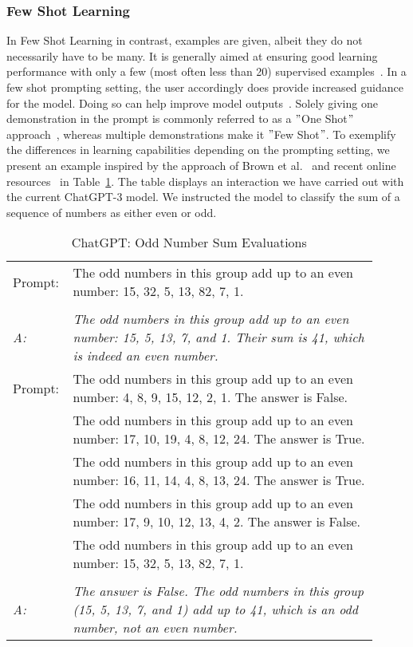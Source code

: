 
\subsubsection{Few Shot Learning}
In Few Shot Learning in contrast, examples are given, albeit they do not necessarily have to be
many.
It is generally aimed at ensuring good learning performance with only a few (most often less than 20)
supervised examples~\cite[p. 1]{samuel_offline_2022}. %
In a few shot prompting setting, the user accordingly does provide increased guidance for the model.
Doing so can help improve model outputs~\cite[p. 1]{dang_how_2022}.
Solely giving one demonstration in the prompt is commonly referred to as a \("\)One Shot\("\)
approach~\cite[p. 6]{brown_language_2020},
whereas multiple demonstrations make it \("\)Few Shot\("\).
To exemplify the differences in learning capabilities depending on the prompting setting,
we present an example inspired by the approach of Brown et al\(.\)~\cite{brown_language_2020}
and recent online resources~\cite{dairai_few-shot_2023} in Table~\ref{tab:odd_number_sum}.
The table displays an interaction we have carried out with the current ChatGPT-3 model.
We instructed the model to classify the sum of a sequence of numbers as either even or odd.

\begin{table}
    \centering
    \caption{ChatGPT: Odd Number Sum Evaluations}
    \begin{tabular}{p{0.1\linewidth}p{0.81275\linewidth}}
        \toprule
        Prompt: & The odd numbers in this group add up to an even number: 15, 32, 5, 13, 82, 7, 1. \\ \\
        \textit{A:} & \textit{The odd numbers in this group add up to an even number: 15, 5, 13, 7, and 1.
        Their sum is 41, which is indeed an even number.}\\
        \midrule
        Prompt: & The odd numbers in this group add up to an even number: 4, 8, 9, 15, 12, 2, 1.
        The answer is False. \\
        & The odd numbers in this group add up to an even number: 17, 10, 19, 4, 8, 12, 24.
        The answer is True. \\
        & The odd numbers in this group add up to an even number: 16, 11, 14, 4, 8, 13, 24.
        The answer is True. \\
        & The odd numbers in this group add up to an even number: 17, 9, 10, 12, 13, 4, 2.
        The answer is False. \\
        & The odd numbers in this group add up to an even number: 15, 32, 5, 13, 82, 7, 1.
        \\ \\
        \textit{A:} & \textit{The answer is False.
        The odd numbers in this group (15, 5, 13, 7, and 1) add up to 41, which is an odd number,
            not an even number.}\\
        \bottomrule
    \end{tabular}
    \label{tab:odd_number_sum}
\end{table}

